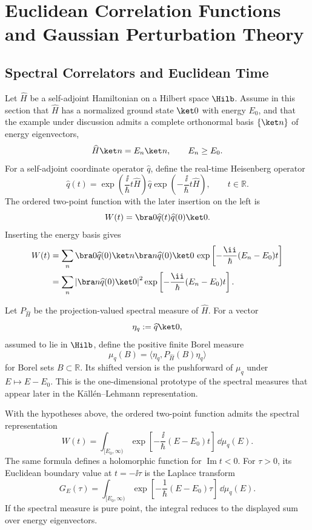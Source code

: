 \chapter{Euclidean Correlation Functions and Gaussian Perturbation Theory}
\label{ch:euclidean-correlation-functions-gaussian-perturbation}
\ConventionsEuclidean


\section{Spectral Correlators and Euclidean Time}

Let \(\widehat H\) be a self-adjoint Hamiltonian on a Hilbert space
\(\Hilb\). Assume in this section that \(\widehat H\) has a normalized
ground state \(\ket 0\) with energy \(E_0\), and that the example under
discussion admits a complete orthonormal basis \(\{\ket n\}\) of energy
eigenvectors,
\[
  \widehat H\ket n=E_n\ket n,\qquad E_n\ge E_0.
\]
For a self-adjoint coordinate operator \(\widehat q\), define the real-time
Heisenberg operator
\[
  \widehat q(t)
  =
  \exp\left(\frac{\ii}{\hbar}t\widehat H\right)
  \widehat q
  \exp\left(-\frac{\ii}{\hbar}t\widehat H\right),
  \qquad t\in\mathbb R.
\]
The ordered two-point function with the later insertion on the left is
\[
  W(t)=\bra 0\widehat q(t)\widehat q(0)\ket 0 .
\]
Inserting the energy basis gives
\[
\begin{aligned}
  W(t)
  &=
  \sum_n
  \bra 0\widehat q(0)\ket n
  \bra n\widehat q(0)\ket 0\,
  \exp\left[-\frac{\ii}{\hbar}(E_n-E_0)t\right]  \\
  &=
  \sum_n
  \left|\bra n\widehat q(0)\ket 0\right|^2
  \exp\left[-\frac{\ii}{\hbar}(E_n-E_0)t\right].
\end{aligned}
\]
\begin{definition}
\label{def:vacuum-coordinate-spectral-measure}
Let \(P_{\widehat H}\) be the projection-valued spectral measure of
\(\widehat H\).  For a vector
\[
\eta_q:=\widehat q\ket0,
\]
assumed to lie in \(\Hilb\), define the positive finite Borel measure
\[
  \mu_q(B)=\langle \eta_q,P_{\widehat H}(B)\eta_q\rangle
\]
for Borel sets \(B\subset\mathbb R\).  Its shifted version is the
pushforward of \(\mu_q\) under \(E\mapsto E-E_0\).  This is the
one-dimensional prototype of the spectral measures that appear later in the
K\"all\'en--Lehmann representation.
\end{definition}

\begin{lemma}
\label{lem:qm-spectral-euclidean-boundary-value}
With the hypotheses above, the ordered two-point function admits the
spectral representation
\[
  W(t)=
  \int_{[E_0,\infty)}
  \exp\left[-\frac{\ii}{\hbar}(E-E_0)t\right]\,\dd\mu_q(E).
\]
The same formula defines a holomorphic function for \(\operatorname{Im}t<0\).
For \(\tau>0\), its Euclidean boundary value at \(t=-\ii\tau\) is the
Laplace transform
\[
  G_E(\tau)
  =
  \int_{[E_0,\infty)}
  \exp\left[-\frac{1}{\hbar}(E-E_0)\tau\right]\,\dd\mu_q(E).
\]
If the spectral measure is pure point, the integral reduces to the displayed
sum over energy eigenvectors.
\end{lemma}

